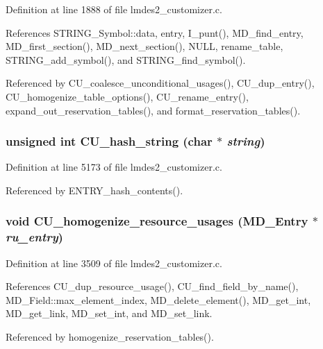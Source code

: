 Definition at line 1888 of file lmdes2\_\-customizer.c.

References STRING\_\-Symbol::data, entry, I\_\-punt(), MD\_\-find\_\-entry, MD\_\-first\_\-section(), MD\_\-next\_\-section(), NULL, rename\_\-table, STRING\_\-add\_\-symbol(), and STRING\_\-find\_\-symbol().

Referenced by CU\_\-coalesce\_\-unconditional\_\-usages(), CU\_\-dup\_\-entry(), CU\_\-homogenize\_\-table\_\-options(), CU\_\-rename\_\-entry(), expand\_\-out\_\-reservation\_\-tables(), and format\_\-reservation\_\-tables().
\subsubsection{\setlength{\rightskip}{0pt plus 5cm}unsigned int CU\_\-hash\_\-string (char $\ast$ {\em string})}\label{lmdes2__customizer_8c_2c1c0879b965f678466adfa8d6c8e412}




Definition at line 5173 of file lmdes2\_\-customizer.c.

Referenced by ENTRY\_\-hash\_\-contents().
\subsubsection{\setlength{\rightskip}{0pt plus 5cm}void CU\_\-homogenize\_\-resource\_\-usages (\bf{MD\_\-Entry} $\ast$ {\em ru\_\-entry})}\label{lmdes2__customizer_8c_3332767efcdc1ab552393d010b97bf22}




Definition at line 3509 of file lmdes2\_\-customizer.c.

References CU\_\-dup\_\-resource\_\-usage(), CU\_\-find\_\-field\_\-by\_\-name(), MD\_\-Field::max\_\-element\_\-index, MD\_\-delete\_\-element(), MD\_\-get\_\-int, MD\_\-get\_\-link, MD\_\-set\_\-int, and MD\_\-set\_\-link.

Referenced by homogenize\_\-reservation\_\-tables().

